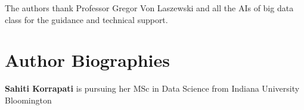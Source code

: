 \documentclass[9pt,twocolumn,twoside]{../../styles/osajnl}
\begin{document}
The authors thank Professor Gregor Von Laszewski and all the AIs of big data class for the guidance and technical support.



 
\section*{Author Biographies}
\begingroup
\setlength\intextsep{0pt}
\begin{minipage}[t][3.2cm][t]{1.0\columnwidth} %
  \noindent
  {\bfseries Sahiti Korrapati} is pursuing her MSc in Data Science from
  Indiana University Bloomington
\end{minipage}
\endgroup
\end{document}
